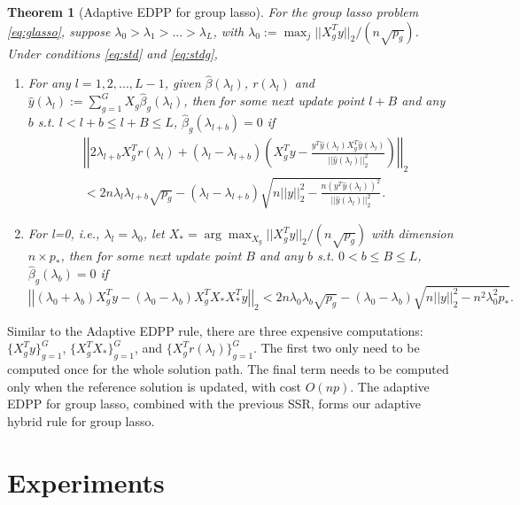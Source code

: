 \documentclass[]{interact}
\theoremstyle{plain}%
\newtheorem{theorem}{Theorem}[section]
\theoremstyle{definition}
\theoremstyle{remark}
\begin{document}
\begin{theorem}[Adaptive EDPP for group lasso]
  For the group lasso problem \eqref{eq:glasso}, suppose $\lambda_0>\lambda_1>...>\lambda_L$, with $\lambda_0:= \max_j ||X_g^Ty||_2 / (n\sqrt{p_g})$. Under conditions \eqref{eq:std} and \eqref{eq:stdg},
    \begin{enumerate}
        \item For any $l=1,2,...,L-1$, given $\hat{\beta}(\lambda_l)$, $r(\lambda_l)$ and $\hat{y}(\lambda_l):=\sum_{g=1}^GX_g\hat{\beta}_g(\lambda_l)$, then for some next update point $l+B$ and any $b$ s.t. $l<l+b\leq l+B\leq L$, $\hat{\beta}_g(\lambda_{l+b})=0$ if
        \begin{equation}
            \begin{split}
                &\left|\left|2\lambda_{l+b}X_g^Tr(\lambda_l)+(\lambda_l-\lambda_{l+b})\left( X_g^Ty-\frac{y^T\hat{y}(\lambda_l)X_g^T\hat{y}(\lambda_l)}{||\hat{y}(\lambda_l)||_2^2}\right)\right|\right|_2\\
                &<2n\lambda_l\lambda_{l+b}\sqrt{p_g}-(\lambda_l-\lambda_{l+b})\sqrt{n||y||_2^2-\frac{n(y^T\hat{y}(\lambda_l))^2}{||\hat{y}(\lambda_l)||_2^2}}.
            \end{split}
        \end{equation}
        \item For l=0, i.e., $\lambda_l=\lambda_0$, let $X_*=\arg \max_{X_g} ||X_g^Ty||_2 / (n\sqrt{p_g})$ with dimension $n\times p_*$, then for some next update point $B$ and any $b$ s.t. $0<b\leq B\leq L$, $\hat{\beta}_g(\lambda_{b})=0$ if
        \begin{equation}
        \left|\left|(\lambda_0+\lambda_b)X_g^Ty-(\lambda_0-\lambda_b)X_g^TX_*X_*^Ty\right|\right|_2<2n\lambda_0\lambda_b\sqrt{p_g}-(\lambda_0-\lambda_b)\sqrt{n||y||_2^2-n^2\lambda_0^2p_*}.
    \end{equation}
    \end{enumerate}
\end{theorem}

Similar to the Adaptive EDPP rule, there are three expensive computations: $\{X_g^Ty\}_{g=1}^G$, $\{X_g^TX_*\}_{g=1}^G$, and $\{X_g^Tr(\lambda_l)\}_{g=1}^G$. The first two only need to be computed once for the whole solution path. The final term needs to be computed only when the reference solution is updated, with cost $O(np)$. The adaptive EDPP for group lasso, combined with the previous SSR, forms our adaptive hybrid rule for group lasso.

\section{Experiments}
\label{sec:experiments}
\end{document}
